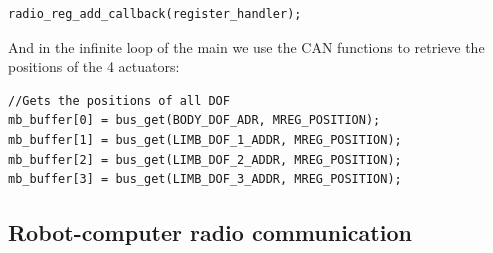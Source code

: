 \documentclass[11pt]{article}
\begin{document}
\begin{verbatim}
radio_reg_add_callback(register_handler);
\end{verbatim}

And in the infinite loop of the main we use the CAN functions to retrieve the positions of the 4 actuators:

\begin{verbatim}
//Gets the positions of all DOF
mb_buffer[0] = bus_get(BODY_DOF_ADR, MREG_POSITION);
mb_buffer[1] = bus_get(LIMB_DOF_1_ADDR, MREG_POSITION);
mb_buffer[2] = bus_get(LIMB_DOF_2_ADDR, MREG_POSITION);
mb_buffer[3] = bus_get(LIMB_DOF_3_ADDR, MREG_POSITION);
\end{verbatim}

\subsection{Robot-computer radio communication}
\label{subsection:radio}
\end{document}

